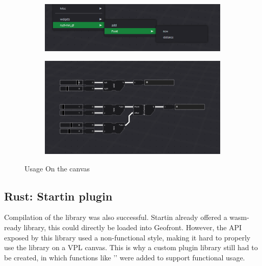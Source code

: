 \begin{figure}
  \centering
  \begin{subfigure}[b]{0.45\linewidth}
    \graphicspath{{../../assets/images/6.1.1/}}
    \centering
    \includegraphics[width=\linewidth]{7.PNG}
    \caption{}\label{fig:rust-plugin-on-canvas:1}
  \end{subfigure}%
  \qquad %
  \begin{subfigure}[b]{0.45\linewidth}
    \graphicspath{{../../assets/images/6.1.1/}}
    \centering
    \includegraphics[width=\linewidth]{6.PNG}
    \caption{}\label{fig:rust-plugin-on-canvas:2}
  \end{subfigure}%
  \caption[minimal rust geofront plugin: usage]{Usage On the canvas}
  \label{fig:rust-plugin-on-canvas}
\end{figure}

\subsection{Rust: Startin plugin}

Compilation of the  library was also successful. 
Startin already offered a wasm-ready library, this could directly be loaded into Geofront. 
However, the API exposed by this library used a non-functional style, making it hard to properly use the library on a VPL canvas. 
This is why a custom plugin library still had to be created, in which functions like '' were added to support functional usage. 

